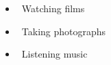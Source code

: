 \documentclass{resume}
\begin{document}
\begin{itemize}[parsep=1ex]
  \item \faFilm\ {Watching films}
  \item \faCamera\ {Taking photographs}
  \item \faHeadphones\ {Listening music}
\end{itemize}

\end{document}
